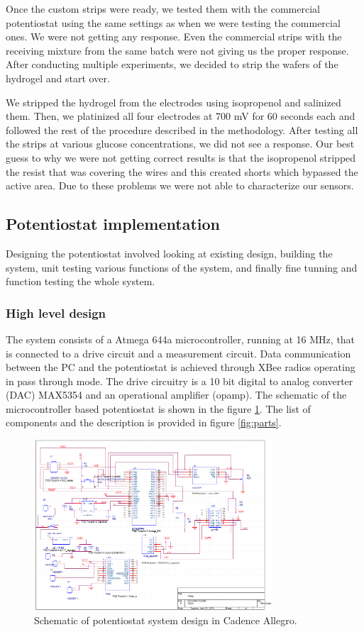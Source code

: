 Once the custom strips were ready, we tested them with the commercial potentiostat using the same settings as when we were testing the commercial ones. We were not getting any response. Even the commercial strips with the receiving mixture from the same batch were not giving us the proper response. After conducting multiple experiments, we decided to strip the wafers of the hydrogel and start over.

We stripped the hydrogel from the electrodes using isopropenol and salinized them. Then, we platinized all four electrodes at 700 mV for 60 seconds each and followed the rest of the procedure described in the methodology. After testing all the strips at various glucose concentrations, we did not see a response. Our best guess to why we were not getting correct results is that the isopropenol stripped the resist that was covering the wires and this created shorts which bypassed the active area. Due to these problems we were not able to characterize our sensors.
 
\subsection{Potentiostat implementation}
Designing the potentiostat involved looking at existing design, building the system, unit testing various functions of the system, and finally fine tunning and function testing the whole system.

\subsubsection{High level design}
The system consists of a  Atmega 644a microcontroller, running at 16 MHz, that is connected to a drive circuit and a measurement circuit. Data communication between the PC and the potentiostat is achieved through XBee radios operating in pass through mode. The drive circuitry is a 10 bit digital to analog converter (DAC) MAX5354 and an operational amplifier (opamp).  The schematic of the microcontroller based potentiostat is shown in the figure \ref{fig:pot_schem}. The list of components and the description is provided in figure \ref{fig:parts}.

\begin{figure} 
\begin{center}
\includegraphics[width=3.5in]{../figures/potentiostat_schematic.png}
\end{center}
\caption{Schematic of potentiostat system design in Cadence Allegro.}
\label{fig:pot_schem}
\end{figure}


